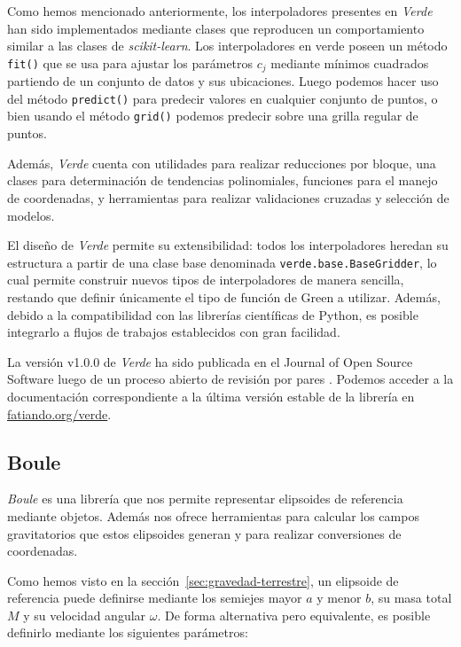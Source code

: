 Como hemos mencionado anteriormente, los interpoladores presentes en
\emph{Verde} han sido implementados mediante clases que reproducen un
comportamiento similar a las clases de \emph{scikit-learn}.
Los interpoladores en verde poseen un método \texttt{fit()} que se usa para
ajustar los parámetros $c_j$ mediante mínimos cuadrados partiendo de un
conjunto de datos y sus ubicaciones. Luego podemos hacer uso del método
\texttt{predict()} para predecir valores en cualquier conjunto de puntos,
o bien usando el método \texttt{grid()} podemos predecir sobre una grilla
regular de puntos.

Además, \emph{Verde} cuenta con utilidades para realizar reducciones por
bloque, una clases para determinación de tendencias polinomiales, funciones
para el manejo de coordenadas, y herramientas para realizar validaciones
cruzadas y selección de modelos.

El diseño de \emph{Verde} permite su extensibilidad: todos los interpoladores
heredan su estructura a partir de una clase base denominada
\texttt{verde.base.BaseGridder}, lo cual permite construir nuevos tipos de
interpoladores de manera sencilla, restando que definir únicamente el tipo de
función de Green a utilizar.
Además, debido a la compatibilidad con las librerías científicas de Python, es
posible integrarlo a flujos de trabajos establecidos con gran facilidad.

La versión v1.0.0 de \emph{Verde} ha sido publicada en el Journal of Open
Source Software luego de un proceso abierto de revisión por pares
\citep{verde2018}.
Podemos acceder a la documentación correspondiente a la última versión estable
de la librería en \href{https://www.fatiando.org/verde}{fatiando.org/verde}.


\subsection{Boule}
\label{sec:boule}

\emph{Boule} es una librería que nos permite representar elipsoides de
referencia mediante objetos. Además nos ofrece herramientas para calcular los
campos gravitatorios que estos elipsoides generan y para realizar conversiones
de coordenadas.

Como hemos visto en la sección~\ref{sec:gravedad-terrestre}, un elipsoide de
referencia puede definirse mediante los semiejes mayor $a$ y menor $b$, su masa
total $M$ y su velocidad angular $\omega$.
De forma alternativa pero equivalente, es posible definirlo mediante los
siguientes parámetros:

